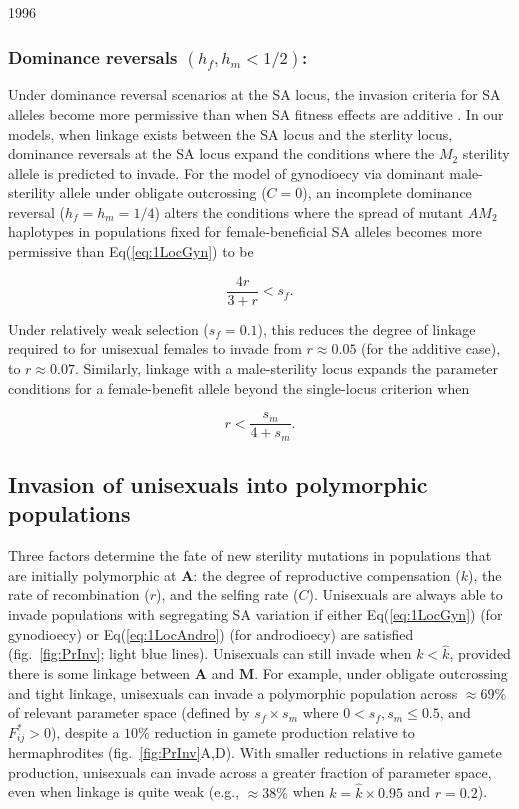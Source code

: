 1996\documentclass[9pt,twocolumn,twoside,lineno]{gsajnl}
\begin{document}
\subsubsection{Dominance reversals $(h_f,h_m < 1/2)$:} Under dominance reversal scenarios at the SA locus, the invasion criteria for SA alleles become more permissive than when SA fitness effects are additive \citep{Kidwell1977,ConnallonClark2012,JordanConnallon2014,Olito2016}. In our models, when linkage exists between the SA locus and the sterlity locus, dominance reversals at the SA locus expand the conditions where the $M_2$ sterility allele is predicted to invade. For the model of gynodioecy via dominant male-sterility allele under obligate outcrossing ($C=0$), an incomplete dominance reversal ($h_f=h_m=1/4$) alters the conditions where the spread of mutant $AM_2$ haplotypes in populations fixed for female-beneficial SA alleles becomes more permissive than Eq(\ref{eq:1LocGyn}) to be

\begin{equation}\label{eq:2LocGynDomRev}
	\frac{4 r}{3 + r} < s_f.
\end{equation}

\noindent Under relatively weak selection ($s_f=0.1$), this reduces the degree of linkage required to for unisexual females to invade from $r \approx 0.05$ (for the additive case), to $r \approx 0.07$. Similarly, linkage with a male-sterility locus expands the parameter conditions for a female-benefit allele beyond the single-locus criterion when

\begin{equation}\label{eq:2LocGynDomRevSA}
	r < \frac{s_m}{4 + s_m}.
\end{equation}


\subsection{Invasion of unisexuals into polymorphic populations}

Three factors determine the fate of new sterility mutations in populations that are initially polymorphic at $\mathbf{A}$: the degree of reproductive compensation ($k$), the rate of recombination ($r$), and the selfing rate ($C$). Unisexuals are always able to invade populations with segregating SA variation if either Eq(\ref{eq:1LocGyn}) (for gynodioecy) or Eq(\ref{eq:1LocAndro}) (for androdioecy) are satisfied (fig.~\ref{fig:PrInv}; light blue lines). Unisexuals can still invade when $k < \hat{k}$, provided there is some linkage between $\mathbf{A}$ and $\mathbf{M}$. For example, under obligate outcrossing and tight linkage, unisexuals can invade a polymorphic population across $\approx 69\%$ of relevant parameter space (defined by $s_f \times s_m$ where $0 < s_f,s_m \leq 0.5$, and $F^{\ast}_{ij} > 0$), despite a $10\%$ reduction in gamete production relative to hermaphrodites (fig.~\ref{fig:PrInv}A,D). With smaller reductions in relative gamete production, unisexuals can invade across a greater fraction of parameter space, even when linkage is quite weak (e.g., $\approx 38\%$ when $k = \hat{k} \times 0.95 $ and $r = 0.2$). 
\end{document}
